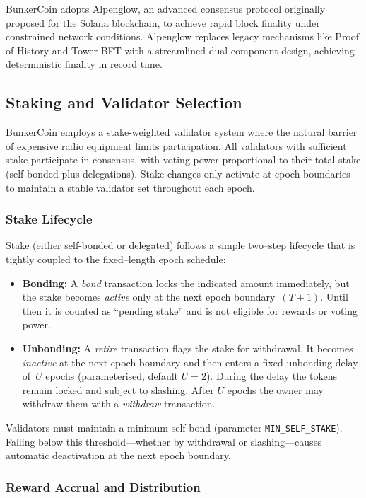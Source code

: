 \documentclass{article}
\begin{document}
BunkerCoin adopts Alpenglow, an advanced consensus protocol originally proposed for the Solana blockchain, to achieve rapid block finality under constrained network conditions. Alpenglow replaces legacy mechanisms like Proof of History and Tower BFT with a streamlined dual-component design, achieving deterministic finality in record time.

\subsection{Staking and Validator Selection}
\label{sec:staking}

BunkerCoin employs a stake-weighted validator system where the natural barrier of expensive radio equipment limits participation. All validators with sufficient stake participate in consensus, with voting power proportional to their total stake (self-bonded plus delegations). Stake changes only activate at epoch boundaries to maintain a stable validator set throughout each epoch.

\subsubsection{Stake Lifecycle} 
\label{sec:stake_lifecycle}

Stake (either self-bonded or delegated) follows a simple two–step lifecycle that is tightly coupled to the fixed–length epoch schedule:
\begin{itemize}
    \item \textbf{Bonding:} A {\em bond} transaction locks the indicated amount immediately, but the stake becomes \emph{active} only at the next epoch boundary~$(T+1)$.  Until then it is counted as ``pending stake'' and is not eligible for rewards or voting power.
    \item \textbf{Unbonding:} A {\em retire} transaction flags the stake for withdrawal.  It becomes \emph{inactive} at the next epoch boundary and then enters a fixed unbonding delay of~$U$ epochs (parameterised, default $U=2$).  During the delay the tokens remain locked and subject to slashing.  After $U$ epochs the owner may withdraw them with a {\em withdraw} transaction.
\end{itemize}

Validators must maintain a minimum self-bond (parameter \texttt{MIN\_SELF\_STAKE}).  Falling below this threshold—whether by withdrawal or slashing—causes automatic deactivation at the next epoch boundary.

\subsubsection{Reward Accrual and Distribution}
\label{sec:stake_rewards}
\end{document}
